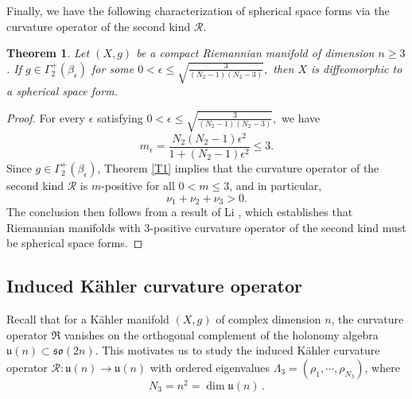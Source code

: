 \documentclass[12pt, twoside]{article}
\newtheorem{theorem}{Theorem}[section]
\theoremstyle{definition}
\numberwithin{equation}{section}
\begin{document}
Finally, we have the following characterization of spherical space forms via the curvature operator of the second kind $\mathcal{R}$.
\begin{theorem}\label{T5}
Let $(X,g)$ be a compact Riemannian manifold of dimension $n\geq3$. If $g\in\Gamma^{+}_{2}(\beta_{\epsilon})$ for some $0<\epsilon\leq\sqrt{\frac{3}{(N_{2}-1)(N_{2}-3)}},$
then $X$ is diffeomorphic to a spherical space form.
\end{theorem}
\begin{proof}
For every $\epsilon$ satisfying $0<\epsilon\leq\sqrt{\frac{3}{(N_{2}-1)(N_{2}-3)}},$  we have
\[
m_{\epsilon}=\frac{N_{2}(N_2-1)\epsilon^2}{1+(N_2-1)\epsilon^2}\leq 3.
\]
Since  $g\in\Gamma^{+}_{2}(\beta_{\epsilon})$, Theorem \ref{T1} implies that the curvature operator of the second kind $\mathcal{R}$ is $m$-positive for all $0<m\leq 3$, and in particular,
\[
\nu_1+\nu_2+\nu_3>0.
\]
The conclusion then follows from a result of Li \cite[Theorem 1.1]{Li24}, which establishes that Riemannian manifolds with $3$-positive curvature operator of the second kind must be spherical space forms.
\end{proof}

\subsection{Induced K\"{a}hler curvature operator}
Recall that for a K\"{a}hler manifold $(X,g)$ of complex dimension $n$, the curvature operator $\mathfrak{R}$ vanishes on the orthogonal complement of the holonomy algebra $\mathfrak{u}(n)\subset\mathfrak{so}(2n)$. This motivates us to study the induced K\"{a}hler curvature operator $\mathscr{R}:\mathfrak{u}(n)\rightarrow\mathfrak{u}(n)$ with ordered eigenvalues $\Lambda_{3}=(\rho_{1},\cdots,\rho_{N_{3}})$, where \begin{equation}
N_{3}=n^2=\dim \mathfrak{u}(n)\,.
\end{equation} 
\end{document}
